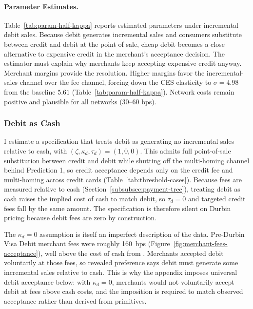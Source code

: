 \documentclass[main.tex]{subfiles}
\begin{document}
\paragraph{Parameter Estimates.}
Table~\ref{tab:param-half-kappa} reports estimated parameters under incremental debit sales.
Because debit generates incremental sales and consumers substitute between credit and debit at the point of sale, cheap debit becomes a close alternative to expensive credit in the merchant's acceptance decision. 
The estimator must explain why merchants keep accepting expensive credit anyway. 
Merchant margins provide the resolution.
Higher margins favor the incremental-sales channel over the fee channel, forcing down the CES elasticity to $\sigma = 4.98$ from the baseline $5.61$ (Table~\ref{tab:param-half-kappa}).
Network costs remain positive and plausible for all networks (30--60 bps).

\subsubsection{Debit as Cash}
\label{subsec:oa-extension}\label{subsubsec:oa-extension}

I estimate a specification that treats debit as generating no incremental sales relative to cash, with $(\zeta, \kappa_d, \tau_d) = (1, 0, 0)$.
This admits full point-of-sale substitution between credit and debit while shutting off the multi-homing channel behind Prediction 1, so credit acceptance depends only on the credit fee and multi-homing across credit cards (Table~\ref{tab:threshold-cases}).
Because fees are measured relative to cash (Section~\ref{subsubsec:payment-tree}), treating debit as cash raises the implied cost of cash to match debit, so $\tau_d = 0$ and targeted credit fees fall by the same amount.
The specification is therefore silent on Durbin pricing because debit fees are zero by construction.

The $\kappa_d = 0$ assumption is itself an imperfect description of the data.
Pre-Durbin Visa Debit merchant fees were roughly 160~bps (Figure~\ref{fig:merchant-fees-acceptance}), well above the cost of cash from \textcite{Felt.etal2020}.
Merchants accepted debit voluntarily at those fees, so revealed preference says debit must generate some incremental sales relative to cash.
This is why the appendix imposes universal debit acceptance below: with $\kappa_d = 0$, merchants would not voluntarily accept debit at fees above cash costs, and the imposition is required to match observed acceptance rather than derived from primitives.
\end{document}
